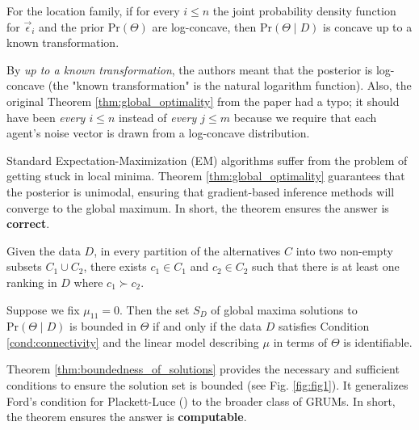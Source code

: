 \begin{theorem} \label{thm:global_optimality}
For the location family, if for every $i \leq n$ the joint probability density function for $\vec{\epsilon}_i$ and the prior $\mathrm{Pr}(\Theta)$ are log-concave, 
then  $\mathrm{Pr}(\Theta \mid D)$ is concave up to a known transformation.
\end{theorem}

\begin{note}
By \textit{up to a known transformation}, the authors meant that the posterior is log-concave (the "known transformation" is the natural logarithm function).
Also, the original Theorem \ref{thm:global_optimality} from the paper had a typo; it should have been \textit{every $i \leq n$} instead of \textit{every $j \leq m$} because we require that each agent's noise vector is drawn from a log-concave distribution.
\end{note}

\begin{remark}
    Standard Expectation-Maximization (EM) algorithms suffer from the problem of getting stuck in local minima.
    Theorem \ref{thm:global_optimality} guarantees that the posterior is unimodal, ensuring that gradient-based inference methods will converge to the global maximum.
    In short, the theorem ensures the answer is \textbf{correct}.
\end{remark}

\begin{condition}[Connectivity]
\label{cond:connectivity}
    Given the data $D$, in every partition of the alternatives $C$ into two non-empty subsets $C_{1} \cup C_{2}$, 
    there exists $c_{1}\in C_{1}$ and $c_{2} \in C_{2}$ such that there is at least one ranking in $D$ where $c_{1} \succ c_{2}$.    
\end{condition}

\begin{theorem} \label{thm:boundedness_of_solutions}
    Suppose we fix $\mu_{11} = 0$.
    Then the set $S_{D}$ of global maxima solutions to $\mathrm{Pr}(\Theta \mid D)$ is bounded in $\Theta$ if and only if the data $D$ satisfies Condition \ref{cond:connectivity} 
    and the linear model describing $\mu$ in terms of $\Theta$ is identifiable.
\end{theorem}

\begin{remark}
    Theorem \ref{thm:boundedness_of_solutions} provides the necessary and sufficient conditions to ensure the solution set is bounded (see Fig. \ref{fig:fig1}).
    It generalizes Ford's condition for Plackett-Luce (\cite{ford1957solution}) to the broader class of GRUMs.
    In short, the theorem ensures the answer is \textbf{computable}.
\end{remark}

